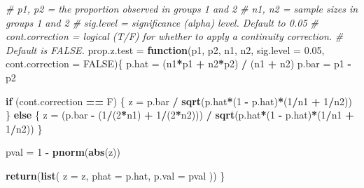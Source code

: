 \documentclass[]{article}
\newenvironment{Shaded}{\begin{snugshade}}{\end{snugshade}}
\newcommand{\KeywordTok}[1]{\textcolor[rgb]{0.13,0.29,0.53}{\textbf{#1}}}
\newcommand{\DataTypeTok}[1]{\textcolor[rgb]{0.13,0.29,0.53}{#1}}
\newcommand{\DecValTok}[1]{\textcolor[rgb]{0.00,0.00,0.81}{#1}}
\newcommand{\FloatTok}[1]{\textcolor[rgb]{0.00,0.00,0.81}{#1}}
\newcommand{\StringTok}[1]{\textcolor[rgb]{0.31,0.60,0.02}{#1}}
\newcommand{\CommentTok}[1]{\textcolor[rgb]{0.56,0.35,0.01}{\textit{#1}}}
\newcommand{\OtherTok}[1]{\textcolor[rgb]{0.56,0.35,0.01}{#1}}
\newcommand{\ControlFlowTok}[1]{\textcolor[rgb]{0.13,0.29,0.53}{\textbf{#1}}}
\newcommand{\OperatorTok}[1]{\textcolor[rgb]{0.81,0.36,0.00}{\textbf{#1}}}
\newcommand{\NormalTok}[1]{#1}
\begin{document}
\begin{Shaded}
\begin{Highlighting}[]
\CommentTok{# p1, p2 = the proportion observed in groups 1 and 2}
\CommentTok{# n1, n2 = sample sizes in groups 1 and 2}
\CommentTok{# sig.level = significance (alpha) level. Default to 0.05}
\CommentTok{# cont.correction = logical (T/F) for whether to apply a continuity correction. }
\CommentTok{#                   Default is FALSE.}
\NormalTok{prop.z.test =}\StringTok{ }\ControlFlowTok{function}\NormalTok{(p1, p2, n1, n2, }\DataTypeTok{sig.level =} \FloatTok{0.05}\NormalTok{, }\DataTypeTok{cont.correction =} \OtherTok{FALSE}\NormalTok{)\{}
\NormalTok{  p.hat =}\StringTok{ }\NormalTok{(n1}\OperatorTok{*}\NormalTok{p1 }\OperatorTok{+}\StringTok{ }\NormalTok{n2}\OperatorTok{*}\NormalTok{p2) }\OperatorTok{/}\StringTok{ }\NormalTok{(n1 }\OperatorTok{+}\StringTok{ }\NormalTok{n2)}
\NormalTok{  p.bar =}\StringTok{ }\NormalTok{p1 }\OperatorTok{-}\StringTok{ }\NormalTok{p2}
  
  \ControlFlowTok{if}\NormalTok{ (cont.correction }\OperatorTok{==}\StringTok{ }\NormalTok{F) \{}
\NormalTok{    z =}\StringTok{ }\NormalTok{p.bar }\OperatorTok{/}\StringTok{ }\KeywordTok{sqrt}\NormalTok{(p.hat}\OperatorTok{*}\NormalTok{(}\DecValTok{1} \OperatorTok{-}\StringTok{ }\NormalTok{p.hat)}\OperatorTok{*}\NormalTok{(}\DecValTok{1}\OperatorTok{/}\NormalTok{n1 }\OperatorTok{+}\StringTok{ }\DecValTok{1}\OperatorTok{/}\NormalTok{n2))}
\NormalTok{  \} }\ControlFlowTok{else}\NormalTok{ \{}
\NormalTok{    z =}\StringTok{ }\NormalTok{(p.bar }\OperatorTok{-}\StringTok{ }\NormalTok{(}\DecValTok{1}\OperatorTok{/}\NormalTok{(}\DecValTok{2}\OperatorTok{*}\NormalTok{n1) }\OperatorTok{+}\StringTok{ }\DecValTok{1}\OperatorTok{/}\NormalTok{(}\DecValTok{2}\OperatorTok{*}\NormalTok{n2))) }\OperatorTok{/}\StringTok{ }\KeywordTok{sqrt}\NormalTok{(p.hat}\OperatorTok{*}\NormalTok{(}\DecValTok{1} \OperatorTok{-}\StringTok{ }\NormalTok{p.hat)}\OperatorTok{*}\NormalTok{(}\DecValTok{1}\OperatorTok{/}\NormalTok{n1 }\OperatorTok{+}\StringTok{ }\DecValTok{1}\OperatorTok{/}\NormalTok{n2))}
\NormalTok{  \}}
  
\NormalTok{  pval =}\StringTok{ }\DecValTok{1} \OperatorTok{-}\StringTok{ }\KeywordTok{pnorm}\NormalTok{(}\KeywordTok{abs}\NormalTok{(z))}
  
  \KeywordTok{return}\NormalTok{(}\KeywordTok{list}\NormalTok{(}
    \DataTypeTok{z =}\NormalTok{ z,}
    \DataTypeTok{phat =}\NormalTok{ p.hat,}
    \DataTypeTok{p.val =}\NormalTok{ pval}
\NormalTok{  ))}
\NormalTok{\}}
\end{Highlighting}
\end{Shaded}
\end{document}
